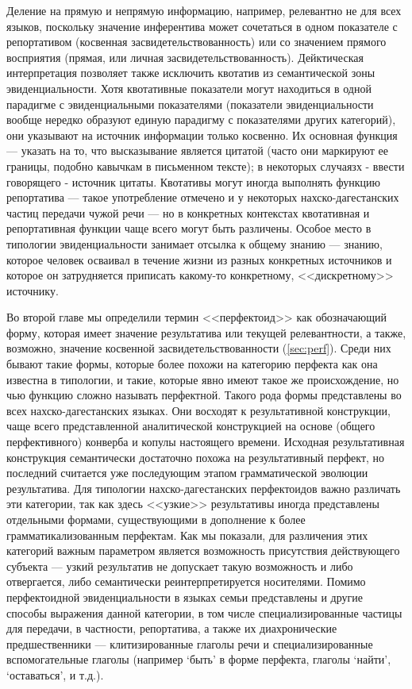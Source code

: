 Деление на прямую и непрямую информацию, например, релевантно не для всех языков, поскольку значение инферентива может сочетаться в одном показателе с репортативом (косвенная засвидетельствованность) или со значением прямого восприятия (прямая, или личная засвидетельствованность). Дейктическая интерпретация позволяет также исключить квотатив из семантической зоны эвиденциальности. Хотя квотативные показатели могут находиться в одной парадигме с эвиденциальными показателями (показатели эвиденциальности вообще нередко образуют единую парадигму с показателями других категорий),  они указывают на источник информации только косвенно. Их основная функция --- указать на то, что высказывание является цитатой (часто они маркируют ее границы, подобно кавычкам в письменном тексте); в некоторых случаязх - ввести говорящего - источник цитаты. Квотативы могут иногда выполнять функцию репортатива --- такое употребление отмечено и у некоторых нахско-дагестанских частиц передачи чужой речи --- но в конкретных контекстах квотативная и репортативная функции чаще всего могут быть различены. Особое место в типологии эвиденциальности занимает отсылка к общему знанию --- знанию, которое человек осваивал в течение жизни из разных конкретных источников и которое он затрудняется приписать какому-то конкретному, <<дискретному>> источнику.
\par Во второй главе мы определили термин <<перфектоид>> как обозначающий форму, которая имеет значение результатива или текущей релевантности, а также, возможно, значение косвенной засвидетельствованности (\ref{sec:perf}). Среди них бывают такие формы, которые более похожи на категорию перфекта как она известна в типологии, и такие, которые явно имеют такое же происхождение, но чью функцию сложно называть перфектной. Такого рода формы представлены во всех нахско-дагестанских языках. Они восходят к результативной конструкции, чаще всего представленной аналитической конструкцией на основе (общего перфективного) конверба и копулы настоящего времени. Исходная результативная конструкция семантически достаточно похожа на результативный перфект, но последний считается уже последующим этапом грамматической эволюции результатива. Для типологии нахско-дагестанских перфектоидов важно различать эти категории, так как здесь <<узкие>> результативы иногда представлены отдельными формами, существующими в дополнение к более грамматикализованным перфектам. Как мы показали, для различения этих категорий важным параметром является возможность присутствия действующего субъекта --- узкий результатив не допускает такую возможность и либо отвергается, либо семантически реинтерпретируется носителями. Помимо перфектоидной эвиденциальности в языках семьи представлены и другие способы выражения данной категории, в том числе специализированные частицы для передачи, в частности, репортатива, а также их диахронические предшественники --- клитизированные глаголы речи и специализированные вспомогательные глаголы (например `быть' в форме перфекта, глаголы `найти', `оставаться', и т.д.).
